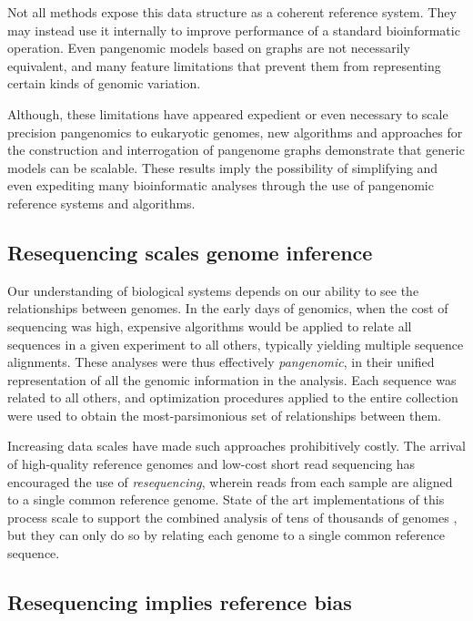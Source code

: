 Not all methods expose this data structure as a coherent reference system.
They may instead use it internally to improve performance of a standard bioinformatic operation.
Even pangenomic models based on graphs are not necessarily equivalent, and many feature limitations that prevent them from representing certain kinds of genomic variation.

Although, these limitations have appeared expedient or even necessary to scale precision pangenomics to eukaryotic genomes, new algorithms and approaches for the construction and interrogation of pangenome graphs demonstrate that generic models can be scalable.
These results imply the possibility of simplifying and even expediting many bioinformatic analyses through the use of pangenomic reference systems and algorithms.

\subsection{Resequencing scales genome inference}

Our understanding of biological systems depends on our ability to see the relationships between genomes.
In the early days of genomics, when the cost of sequencing was high, expensive algorithms would be applied to relate all sequences in a given experiment to all others, typically yielding multiple sequence alignments.
These analyses were thus effectively \emph{pangenomic}, in their unified representation of all the genomic information in the analysis.
Each sequence was related to all others, and optimization procedures applied to the entire collection were used to obtain the most-parsimonious set of relationships between them.

Increasing data scales have made such approaches prohibitively costly.
The arrival of high-quality reference genomes and low-cost short read sequencing has encouraged the use of \emph{resequencing}, wherein reads from each sample are aligned to a single common reference genome.
State of the art implementations of this process scale to support the combined analysis of tens of thousands of genomes \cite{Poplin_2017}, but they can only do so by relating each genome to a single common reference sequence.

\subsection{Resequencing implies reference bias}

